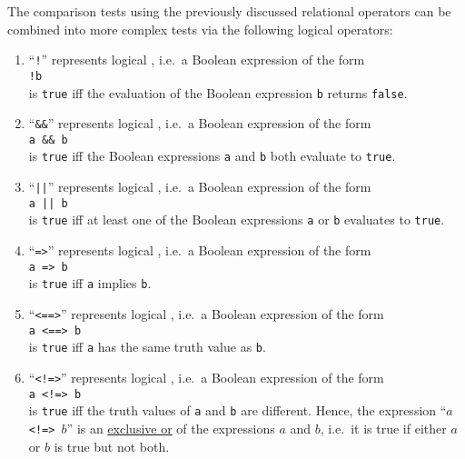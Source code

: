 The comparison tests using the previously discussed relational operators can be combined into more
complex tests via the following logical operators:
\begin{enumerate}
\item ``\texttt{!}''  represents logical , i.e.~a Boolean expression of the form
      \\[0.2cm]
      \hspace*{1.3cm}
      \texttt{!b}
      \\[0.2cm]
      is \texttt{true} iff the evaluation of the Boolean expression \texttt{b} returns \texttt{false}.
\item ``\texttt{\&\&}'' represents logical , i.e.~a Boolean expression of the form
      \\[0.2cm]
      \hspace*{1.3cm}
      \texttt{a \&\& b}
      \\[0.2cm]
      is \texttt{true} iff the Boolean expressions \texttt{a} and \texttt{b} both evaluate to \texttt{true}.
\item ``\texttt{||}''  represents logical , i.e.~a Boolean expression of the form
      \\[0.2cm]
      \hspace*{1.3cm}
      \texttt{a || b}
      \\[0.2cm]
      is \texttt{true} iff at least one of the Boolean expressions \texttt{a} or \texttt{b} evaluates to \texttt{true}.
\item ``\texttt{=>}''  represents logical , i.e.~a Boolean expression of the form
      \\[0.2cm]
      \hspace*{1.3cm}
      \texttt{a => b}
      \\[0.2cm]
      is \texttt{true} iff  \texttt{a} implies \texttt{b}.
\item ``\texttt{<==>}''  represents logical , i.e.~a Boolean expression of the form
      \\[0.2cm]
      \hspace*{1.3cm}
      \texttt{a <==> b}
      \\[0.2cm]
      is \texttt{true} iff  \texttt{a} has the same truth value as \texttt{b}.
\item ``\texttt{<!=>}''  represents logical , i.e.~a Boolean expression of the form
      \\[0.2cm]
      \hspace*{1.3cm}
      \texttt{a <!=> b}
      \\[0.2cm]
      is \texttt{true} iff the truth values of \texttt{a} and \texttt{b} are different.  Hence, the expression
      ``\texttt{$a$ <!=> $b$}'' is an \href{https://en.wikipedia.org/wiki/Exclusive_or}{exclusive or} of the
      expressions $a$ and $b$, i.e.~it is true if either $a$ or $b$ is true but not both.
\end{enumerate}

